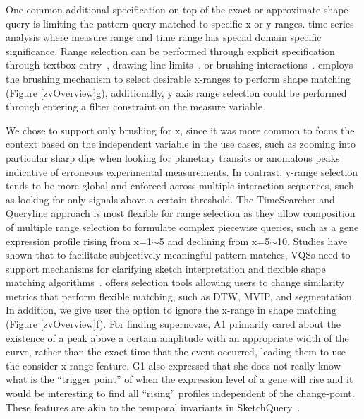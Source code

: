 One common additional specification on top of the exact or approximate shape query is limiting the pattern query matched to specific x or y ranges. time series analysis where measure range and time range has special domain specific significance. Range selection can be performed through explicit specification through textbox entry~\cite{wattenberg2001sketching,Mannino2018}, drawing line limits~\cite{ryall2005querylines}, or brushing interactions~\cite{Hochheiser2001}. \zv employs the brushing mechanism to select desirable x-ranges to perform shape matching (Figure \ref{zvOverview}g), additionally, y axis range selection could be performed through entering a filter constraint on the measure variable.
\par We chose to support only brushing for x, since it was more common to focus the context based on the independent variable in the use cases, such as zooming into particular sharp dips when looking for planetary transits or anomalous peaks indicative of erroneous experimental measurements. In contrast, y-range selection tends to be more global and enforced across multiple interaction sequences, such as looking for only signals above a certain threshold. The TimeSearcher and Queryline approach is most flexible for range selection as they allow composition of multiple range selection to formulate complex piecewise queries, such as a gene expression profile rising from x=1$\sim$5 and declining from x=5$\sim$10.
Studies have shown that to facilitate subjectively meaningful pattern matches, VQSs need to support mechanisms for clarifying sketch interpretation and flexible shape matching algorithms~\cite{correll2016semantics,Mannino2018,Eichmann2015}. \zv offers selection tools allowing users to change similarity metrics that perform flexible matching, such as DTW, MVIP, and segmentation. In addition, we give user the option to ignore the x-range in shape matching (Figure \ref{zvOverview}f). For finding supernovae, A1 primarily cared about the existence of a peak above a certain amplitude with an appropriate width of the curve, rather than the exact time that the event occurred, leading them to use the consider x-range feature. G1 also expressed that she does not really know what is the ``trigger point'' of when the expression level of a gene will rise and it would be interesting to find all ``rising'' profiles independent of the change-point. These features are akin to the temporal invariants in SketchQuery~\cite{correll2016semantics}.

